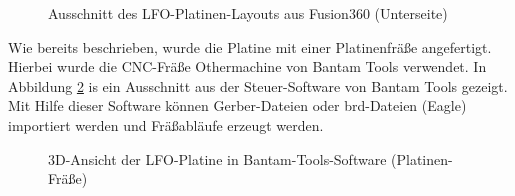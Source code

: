 \begin{figure}[h]
	\centering
	\setlength{\fboxsep}{1pt} %
	\setlength{\fboxrule}{1pt} %
	\caption{Ausschnitt des LFO-Platinen-Layouts aus Fusion360 (Unterseite)}
	\label{fig:PCB_LFO_bottom}
\end{figure}
\FloatBarrier

\newpage

Wie bereits beschrieben, wurde die Platine mit einer Platinenfräße angefertigt. Hierbei wurde die CNC-Fräße \grqq{}Othermachine\grqq{} von \grqq{}Bantam Tools\grqq{} verwendet. In Abbildung \ref{fig:bantam_tools_lfo} is ein Ausschnitt aus der Steuer-Software von \grqq{}Bantam Tools\grqq{} gezeigt. Mit Hilfe dieser Software können Gerber-Dateien oder brd-Dateien (Eagle) importiert werden und Fräßabläufe erzeugt werden.

\begin{figure}[h]
	\centering
	\setlength{\fboxsep}{1pt} %
	\setlength{\fboxrule}{1pt} %
	\caption{3D-Ansicht der LFO-Platine in Bantam-Tools-Software (Platinen-Fräße) \cite{bantam}}
	\label{fig:bantam_tools_lfo}
\end{figure}
\FloatBarrier

